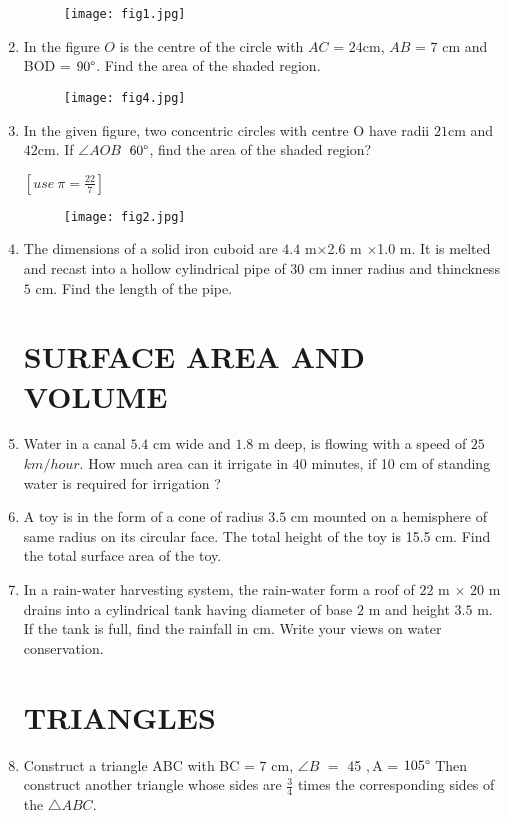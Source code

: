 \documentclass{article}
\begin{document}
\begin{enumerate}
\begin{figure}[H]
    \centering
    \texttt{[image: fig1.jpg]}
    
\end{figure}

\item In the figure $O$ is the centre of the circle with $A$$C$ = $24$cm, $A$$B$ = $7$ cm and \angle BOD = $90\degree$. Find the area of the shaded region.
\begin{figure}[H]
    \centering
    \texttt{[image: fig4.jpg]}
\end{figure}

\item In the  given figure, two concentric circles with centre O have radii $21$cm and $42$cm. If $ \angle AOB \ $ $60\degree$, find the area of the shaded region? 

\hfill$[use\  \pi=\frac{22}{7}]$

\begin{figure}[H]
        \centering
        \texttt{[image: fig2.jpg]}
    \end{figure}

\item The dimensions of a solid iron cuboid are $4.4$ m$\times$2.6 m $\times$1.0 m. It is melted and recast into a hollow cylindrical pipe of $30$ cm inner radius and thinckness $5$ cm. Find the length of the pipe.

\section{SURFACE AREA AND VOLUME}

\item Water in a canal $5.4$ cm wide and $1.8$ m deep, is flowing with a speed of $25$$km/hour$. How much area can it irrigate in $40$ minutes, if 10 cm of standing water is required for irrigation ?

\item A toy is in the form of a cone of radius $3.5$ cm mounted on a hemisphere of same radius on its circular face. The total height of the toy is 15.5 cm. Find the total surface area of the toy.

\item In a rain-water harvesting system, the rain-water form a roof of $22$ m $\times$ $20$ m drains into a cylindrical tank having diameter of base $2$ m and height $3.5$ m. If the tank is full, find the rainfall in cm. Write your views on water conservation.


\section{TRIANGLES}

\item Construct a triangle ABC with BC = $7$ cm, $\angle  B$ $=  $ 45 \degree$,  $\angle A = $ 105\degree$
Then construct another triangle whose sides are $\frac{3}{4}$ times the corresponding sides of the $\triangle ABC$.

\end{enumerate}
\end{document}
